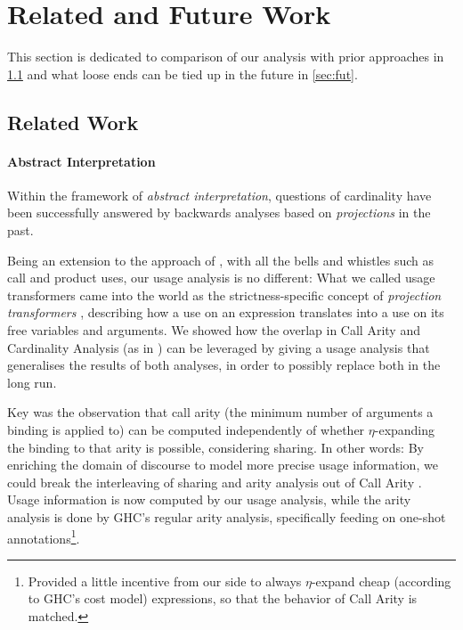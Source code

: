 \chapter{Related and Future Work}\label{sec:relfut}

This section is dedicated to comparison of our analysis with prior approaches in \cref{sec:rel} and what loose ends can be tied up in the future in \cref{sec:fut}.

\section{Related Work}\label{sec:rel}

\subsubsection{Abstract Interpretation}

Within the framework of \emph{abstract interpretation}, questions of cardinality have been successfully answered by backwards analyses based on \emph{projections} \parencite{projs} in the past.

Being an extension to the approach of \textcite{card}, with all the bells and whistles such as call and product uses, our usage analysis is no different:
What we called usage transformers came into the world as the strictness-specific concept of \emph{projection transformers} \parencite{projimpl}, describing how a use on an expression translates into a use on its free variables and arguments.
We showed how the overlap in Call Arity \parencite{callarity} and Cardinality Analysis (as in \parencite{card}) can be leveraged by giving a usage analysis that generalises the results of both analyses, in order to possibly replace both in the long run.

Key was the observation that call arity (the minimum number of arguments a binding is applied to) can be computed independently of whether $\eta$-expanding the binding to that arity is possible, considering sharing.
In other words:
By enriching the domain of discourse to model more precise usage information, we could break the interleaving of sharing and arity analysis out of Call Arity \parencite{callarity}.
Usage information is now computed by our usage analysis, while the arity analysis is done by GHC's regular arity analysis, specifically feeding on one-shot annotations\footnote{Provided a little incentive from our side to always $\eta$-expand cheap (according to GHC's cost model) expressions, so that the behavior of Call Arity is matched.}.

